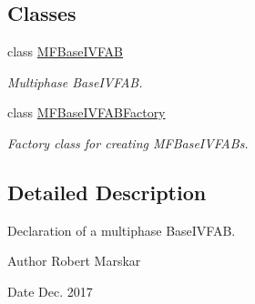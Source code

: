 \subsection*{Classes}
\begin{DoxyCompactItemize}
\item 
class \hyperlink{classMFBaseIVFAB}{M\+F\+Base\+I\+V\+F\+AB}
\begin{DoxyCompactList}\small\item\em Multiphase Base\+I\+V\+F\+AB. \end{DoxyCompactList}\item 
class \hyperlink{classMFBaseIVFABFactory}{M\+F\+Base\+I\+V\+F\+A\+B\+Factory}
\begin{DoxyCompactList}\small\item\em Factory class for creating M\+F\+Base\+I\+V\+F\+A\+Bs. \end{DoxyCompactList}\end{DoxyCompactItemize}


\subsection{Detailed Description}
Declaration of a multiphase Base\+I\+V\+F\+AB. 

\begin{DoxyAuthor}{Author}
Robert Marskar 
\end{DoxyAuthor}
\begin{DoxyDate}{Date}
Dec. 2017 
\end{DoxyDate}
